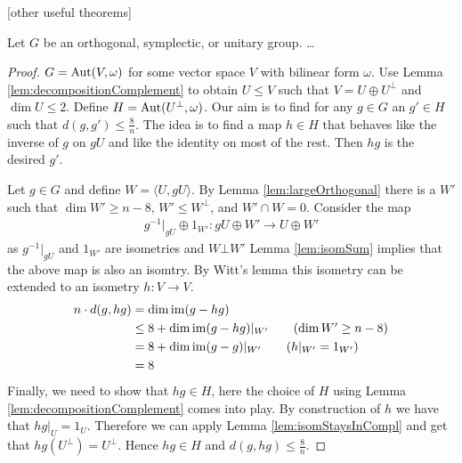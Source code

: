 [other useful theorems]


\begin{lemma}
Let $G$ be an orthogonal, symplectic, or unitary group. \dots
\end{lemma}
\begin{proof}
$G=\operatorname{Aut}(V,\omega)$ for some vector space $V$ with  bilinear form $\omega$. Use Lemma \ref{lem:decompositionComplement} to obtain $U\leq V$ such that $V=U\oplus U^\bot$ and $\dim U\leq2$. Define $H=\operatorname{Aut}(U^\bot,\omega)$. Our aim is to find for any $g\in G$ an $g'\in H$ such that $d(g,g')\leq\frac{8}{n}$.
The idea is to find a map $h\in H$ that behaves like the inverse of $g$ on $gU$ and like the identity on most of the rest. Then $hg$ is the desired $g'$.

Let $g\in G$ and define $W=\langle U,gU\rangle$. By Lemma \ref{lem:largeOrthogonal} there is a $W'$ such that $\dim W'\geq n-8$, $W'\leq W^\bot$, and $W'\cap W=0$. Consider the map
\begin{align*}
 g^{-1}|_{gU}\oplus 1_{W'}\colon gU\oplus W'\to U\oplus W'
\end{align*}
as $g^{-1}|_{gU}$ and $1_{W'}$ are isometries and $W\bot W'$ Lemma \ref{lem:isomSum} implies that the above map is also an isomtry. By Witt's lemma this isometry can be extended to an isometry $h\colon V\to V$. 
\begin{align*}
n\cdot d(g,hg)&=\dim\im (g-hg)\\
&\leq 8+\dim \im(g-hg)|_{W'}\tag{$\dim W'\geq n-8$}\\
&= 8+\dim \im(g-g)|_{W'}\tag{$h|_{W'}=1_{W'}$}\\
&=8
\end{align*}
Finally, we need to show that $hg\in H$, here the choice of $H$ using Lemma \ref{lem:decompositionComplement} comes into play. By construction of $h$ we have that $hg|_U=1_U$. Therefore we can apply Lemma \ref{lem:isomStaysInCompl} and get that $hg(U^\bot)= U^\bot$. Hence $hg\in H$ and $d(g,hg)\leq\frac{8}{n}$.

\end{proof}
